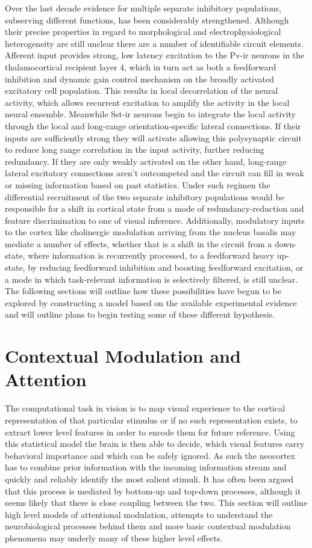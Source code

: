 Over the last decade evidence for multiple separate inhibitory
populations, subserving different functions, has been considerably
strengthened. Although their precise properties in regard to
morphological and electrophysiological heterogeneity are still unclear
there are a number of identifiable circuit elements. Afferent input
provides strong, low latency excitation to the Pv-ir neurons in the
thalamocortical recipient layer 4, which in turn act as both a
feedforward inhibition and dynamic gain control mechanism on the
broadly activated excitatory cell population. This results in local
decorrelation of the neural activity, which allows recurrent
excitation to amplify the activity in the local neural
ensemble. Meanwhile Sst-ir neurons begin to integrate the local
activity through the local and long-range orientation-specific lateral
connections. If their inputs are sufficiently strong they will
activate allowing this polysynaptic circuit to reduce long range
correlation in the input activity, further reducing redundancy. If
they are only weakly activated on the other hand, long-range lateral
excitatory connections aren't outcompeted and the circuit can fill in
weak or missing information based on past statistics. Under such
regimen the differential recruitment of the two separate inhibitory
populations would be responsible for a shift in cortical state from a
mode of redundancy-reduction and feature discrimination to one of
visual inference. Additionally, modulatory inputs to the cortex like
cholinergic modulation arriving from the nucleus basalis may mediate a
number of effects, whether that is a shift in the circuit from a
down-state, where information is recurrently processed, to a
feedforward heavy up-state, by reducing feedforward inhibition and
boosting feedforward excitation, or a mode in which task-relevant
information is selectively filtered, is still unclear. The following
sections will outline how these possibilities have begun to be
explored by constructing a model based on the available experimental
evidence and will outline plans to begin testing some of these
different hypothesis.

\section{Contextual Modulation and Attention}

The computational task in vision is to map visual experience to the
cortical representation of that particular stimulus or if no such
representation exists, to extract lower level features in order to
encode them for future reference. Using this statistical model the
brain is then able to decide, which visual features carry behavioral
importance and which can be safely ignored. As such the neocortex has
to combine prior information with the incoming information stream and
quickly and reliably identify the most salient stimuli. It has often
been argued that this process is mediated by bottom-up and top-down
processes, although it seems likely that there is close coupling
between the two. This section will outline high level models of
attentional modulation, attempts to understand the neurobiological
processes behind them and more basic contextual modulation phenomena
may underly many of these higher level effects.



